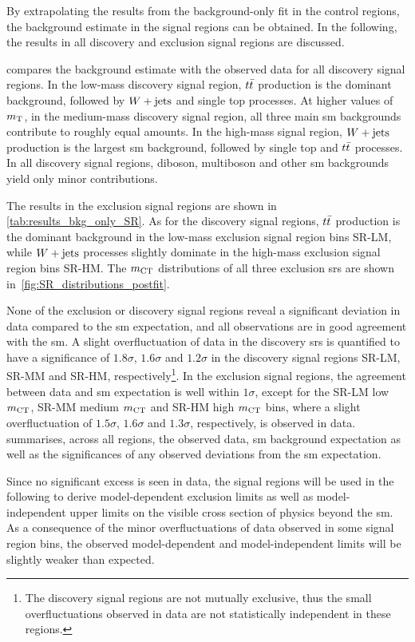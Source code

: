 By extrapolating the results from the background-only fit in the control regions, the background estimate in the signal regions can be obtained.
In the following, the results in all discovery and exclusion signal regions are discussed.

 compares the background estimate with the observed data for all discovery signal regions.
In the low-mass discovery signal region, $t\bar{t}$ production is the dominant background, followed by $W+\mathrm{jets}$ and single top processes. At higher values of $m_{\textrm{T}}$, \ie in the medium-mass discovery signal region, all three main \gls{sm} backgrounds contribute to roughly equal amounts.
In the high-mass signal region, $W+\mathrm{jets}$ production is the largest \gls{sm} background, followed by single top and $t\bar{t}$ processes.
In all discovery signal regions, diboson, multiboson and other \gls{sm} backgrounds yield only minor contributions. 

The results in the exclusion signal regions are shown in \cref{tab:results_bkg_only_SR}.
As for the discovery signal regions, $t\bar{t}$ production is the dominant background in the low-mass exclusion signal region bins SR-LM, while $W+\mathrm{jets}$ processes slightly dominate in the high-mass exclusion signal region bins SR-HM.
The $m_{\textrm{CT}}$ distributions of all three exclusion \glspl{sr} are shown in~\cref{fig:SR_distributions_postfit}.

None of the exclusion or discovery signal regions reveal a significant deviation in data compared to the \gls{sm} expectation, and all observations are in good agreement with the \gls{sm}.
A slight overfluctuation of data in the discovery \glspl{sr} is quantified to have a significance of $1.8\sigma$, $1.6\sigma$ and $1.2\sigma$ in the discovery signal regions SR-LM, SR-MM and SR-HM, respectively\footnote{The discovery signal regions are not mutually exclusive, thus the small overfluctuations observed in data are not statistically independent in these regions.}.
In the exclusion signal regions, the agreement between data and \gls{sm} expectation is well within $1\sigma$, except for the SR-LM low $m_{\textrm{CT}}$, SR-MM medium $m_{\textrm{CT}}$ and SR-HM high $m_{\textrm{CT}}$ bins, where a slight overfluctuation of $1.5\sigma$, $1.6\sigma$ and $1.3\sigma$, respectively, is observed in data.
 summarises, across all regions, the observed data, \gls{sm} background expectation as well as the significances of any observed deviations from the \gls{sm} expectation.

Since no significant excess is seen in data, the signal regions will be used in the following to derive model-dependent exclusion limits as well as model-independent upper limits on the visible cross section of physics beyond the \gls{sm}.
As a consequence of the minor overfluctuations of data observed in some signal region bins, the observed model-dependent and model-independent limits will be slightly weaker than expected. 

